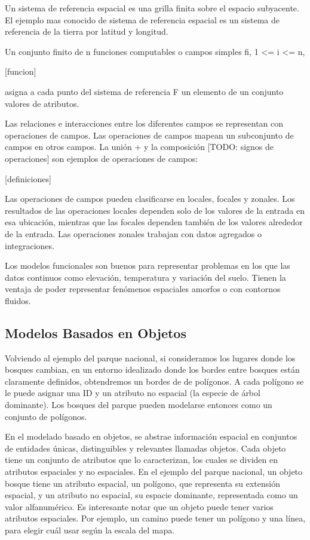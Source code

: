 Un sistema de referencia espacial es una grilla finita sobre el espacio subyacente. El ejemplo mas conocido de sistema de referencia espacial es un sistema de referencia de la tierra por latitud y longitud.

Un conjunto finito de n funciones computables o campos simples {fi, 1 <= i <= n},

[funcion]

asigna a cada punto del sistema de referencia F un elemento de un conjunto valores de atributos.

Las relaciones e interacciones entre los diferentes campos se representan con operaciones de campos. Las operaciones de campos mapean un subconjunto de campos en otros campos. La unión + y la composición [TODO: signos de operaciones] son ejemplos de operaciones de campos:

[definiciones]

Las operaciones de campos pueden clasificarse en locales, focales y zonales. Los resultados de las operaciones locales dependen solo de los valores de la entrada en esa ubicación, mientras que las focales dependen también de los valores alrededor de la entrada. Las operaciones zonales trabajan con datos agregados o integraciones.

Los modelos funcionales son buenos para representar problemas en los que las datos continuos como elevación, temperatura y variación del suelo. Tienen la ventaja de poder representar fenómenos espaciales amorfos o con contornos fluidos.

\subsection{Modelos Basados en Objetos}

Volviendo al ejemplo del parque nacional, si consideramos los lugares donde los bosques cambian, en un entorno idealizado donde los bordes entre bosques están claramente definidos, obtendremos un bordes de de polígonos. A cada polígono se le puede asignar una ID y un atributo no espacial (la especie de árbol dominante). Los bosques del parque pueden modelarse entonces como un conjunto de polígonos.

En el modelado basado en objetos, se abstrae información espacial en conjuntos de entidades únicas, distinguibles y relevantes llamadas objetos. Cada objeto tiene un conjunto de atributos que lo caracterizan, los cuales se dividen en atributos espaciales y no espaciales. En el ejemplo del parque nacional, un objeto bosque tiene un atributo espacial, un polígono, que representa su extensión espacial, y un atributo no espacial, su espacie dominante, representada como un valor alfanumérico. Es interesante notar que un objeto puede tener varios atributos espaciales. Por ejemplo, un camino puede tener un polígono y una línea, para elegir cuál usar según la escala del mapa.

